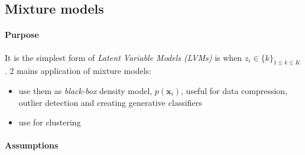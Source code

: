 \subsection{Mixture models}
\paragraph{Purpose}
It is the simplest form of \emph{Latent Variable Models (LVMs)} is when $z_{i}\in
\{k\}_{1\leq k\leq K}$. 2 mains application of mixture models:
\begin{itemize}
    \item use them as \emph{black-box} density model, $p(\bm{x}_{i})$, useful for data
        compression, outlier detection and creating generative classifiers
    \item use for clustering
\end{itemize}

\paragraph{Assumptions}
